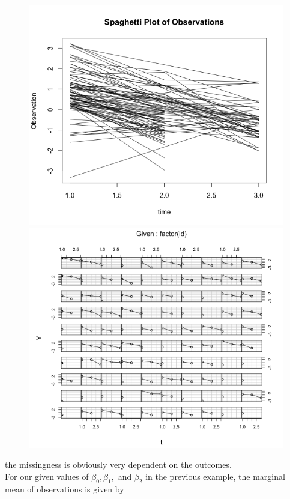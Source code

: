 \documentclass[11pt]{article}
\begin{document}
\begin{enumerate}
\begin{enumerate}
				\begin{figure}[H]
					\includegraphics[scale=0.4]{Rplot1b3}
					\includegraphics[scale=0.4]{Rplot1b4}
				\end{figure}
				the missingness is obviously very dependent on the outcomes.
			\\	For our given values of $\beta_0, \beta_1,$ and $\beta_2$ in the previous example, the marginal mean of observations is given by
				\begin{align*}

\end{align*}
\end{enumerate}
\end{enumerate}
\end{document}
